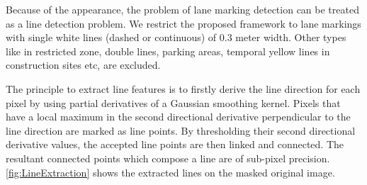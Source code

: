 Because of the appearance, the problem of lane marking detection can be treated as a line detection problem. We restrict the proposed framework to lane markings with single white lines (dashed or continuous) of 0.3 meter width. Other types like in restricted zone, double lines, parking areas, temporal yellow lines in construction sites etc, are excluded.%

The principle to extract line features is to firstly derive the line direction for each pixel by using partial derivatives of a Gaussian smoothing kernel. Pixels that have a local maximum in the second directional derivative perpendicular to the line direction are marked as line points. By thresholding their second directional derivative values, the accepted line points are then linked and connected.
The resultant connected points which compose a line are of sub-pixel precision. \cref{fig:LineExtraction} shows the extracted lines on the masked original image.

